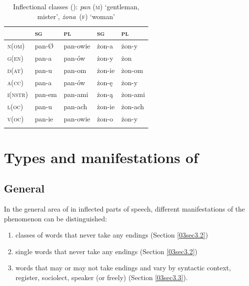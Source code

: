 \documentclass[output=paper,colorlinks,citecolor=brown]{langscibook}
\begin{document}
\begin{table}[ht]
	\centering
	\begin{tabularx}{0.8\textwidth}{XXXXX}
		\lsptoprule
			& \textsc{sg} & \textsc{pl} & \textsc{sg} & \textsc{pl} \\
			\midrule
			\textsc{n(om)} & pan-Ø & pan-owie & żon-a & żon-y \\
			\textsc{g(en)} & pan-a & pan-ów & żon-y & żon \\
			\textsc{d(at)} & pan-u & pan-om & żon-ie & żon-om \\
			\textsc{a(cc)} & pan-a & pan-ów & żon-ę & żon-y \\
			\textsc{i(nstr)} & pan-em & pan-ami & żon-ą & żon-ami \\
			\textsc{l(oc)} & pan-u & pan-ach & żon-ie & żon-ach \\
			\textsc{v(oc)} & pan-ie & pan-owie & żon-o & żon-y  \\
		\lspbottomrule
	\end{tabularx}
	\caption{Inflectional classes (): \emph{pan} (\textsc{m}) `gentleman, mister', \mbox{\emph{żona} (\textsc{f})} `woman'}
	\label{03tab1}
\end{table}


\section{Types and manifestations of } \label{03sec3}

\subsection{General}

In the general area of  in inflected parts of speech, different manifestations of the phenomenon can be distinguished:

\begin{enumerate}
	\item classes of words that never take any endings (Section \ref{03sec3.2})
	
	\item single words that never take any endings (Section \ref{03sec3.2})
	
	\item words that may or may not take endings and vary by syntactic context, register, sociolect, speaker (or freely) (Section \ref{03sec3.3}).
\end{enumerate}
\end{document}
